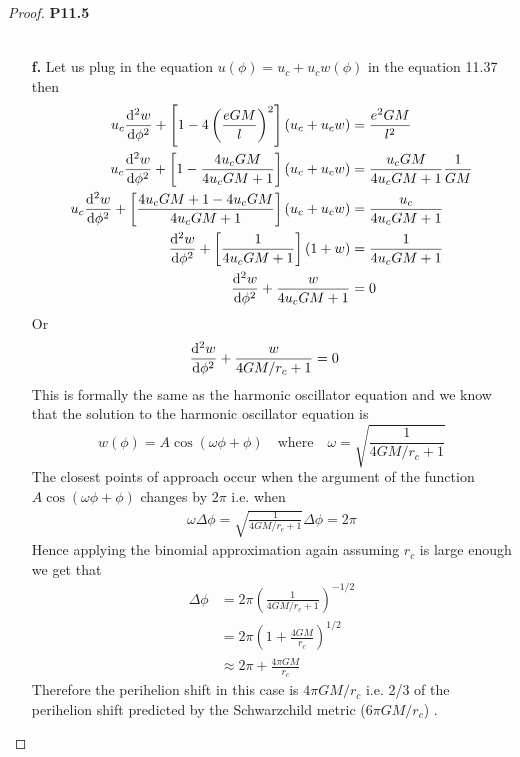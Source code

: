 \documentclass[11pt]{article}
\theoremstyle{definition}
\begin{document}
\begin{proof}{\textbf{P11.5}}
\begin{itemize}
\begin{align*}
    \end{align*}
\cleardoublepage
    \item [\textbf{f.}] Let us plug in the equation $u(\phi) = u_c + u_c w(\phi)$
    in the equation 11.37 then
    \begin{align*}
        u_c\dv[2]{w}{\phi}
        + \left[1 - 4\left(\frac{eGM}{l}\right)^2\right](u_c + u_cw)
        &= \frac{e^2GM}{l^2}\\
        u_c\dv[2]{w}{\phi}
        + \left[1 - \frac{4u_c GM}{4u_cGM + 1}\right](u_c + u_cw)
        &= \frac{u_c GM}{4u_cGM + 1}\frac{1}{GM}\\
        u_c\dv[2]{w}{\phi}
        + \left[\frac{4u_cGM + 1 - 4u_cGM}{4u_cGM + 1}\right](u_c + u_cw)
        &= \frac{u_c}{4u_cGM + 1}\\
        \dv[2]{w}{\phi}
        + \left[\frac{1}{4u_cGM + 1}\right](1 + w)
        &= \frac{1}{4u_cGM + 1}\\
        \dv[2]{w}{\phi} + \frac{w}{4u_cGM + 1} &= 0
    \end{align*}
    Or
    \begin{align*}
        \dv[2]{w}{\phi} + \frac{w}{4GM/r_c + 1} &= 0
    \end{align*}
    This is formally the same as the harmonic oscillator equation and we know
    that the solution to the harmonic oscillator equation is
    $$w(\phi) = A\cos(\omega\phi + \phi) \quad\text{where}\quad 
    \omega = \sqrt{\frac{1}{4GM/r_c + 1}}$$
    The closest points of approach occur when the argument of the function
    $A\cos(\omega\phi + \phi)$ changes by $2\pi$ i.e. when
    \begin{align*}
        \omega\Delta\phi = \sqrt{\frac{1}{4GM/r_c + 1}}\Delta\phi = 2\pi
    \end{align*}
    Hence applying the binomial approximation again assuming $r_c$ is large
    enough we get that
    \begin{align*}
        \Delta\phi &= 2\pi\left(\frac{1}{4GM/r_c + 1}\right)^{-1/2}\\
        &= 2\pi\left(1 + \frac{4GM}{r_c}\right)^{1/2}\\
        &\approx 2\pi + \frac{4\pi GM}{r_c}
    \end{align*}
    Therefore the perihelion shift in this case is $4\pi GM/r_c$ i.e. 2/3 of the
    perihelion shift predicted by the Schwarzchild metric ($6\pi GM/r_c$) .
\end{itemize}
\end{proof}
\cleardoublepage
\end{document}
